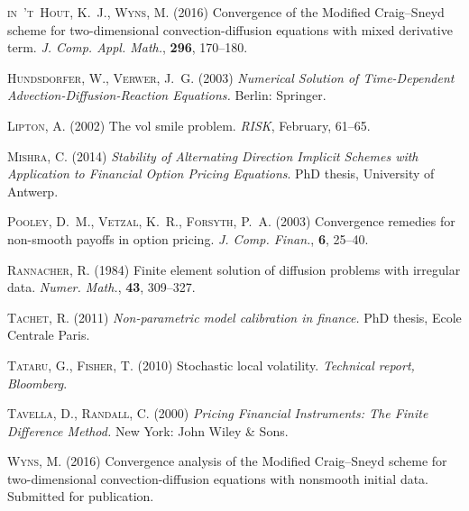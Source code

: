 \documentclass[10pt]{article}
\begin{document}
\begin{thebibliography}{99}
 \textsc{in~'t~Hout, K.~J., Wyns, M.} (2016)
Convergence of the Modified Craig--Sneyd scheme for two-dimensional convection-diffusion equations with mixed derivative term.
\textit{J. Comp. Appl. Math.}, \textbf{296}, 170--180.

 \textsc{Hundsdorfer, W., Verwer, J.~G.} (2003)
\textit{Numerical Solution of Time-Dependent Advection-Diffusion-Reaction Equations.}
Berlin: Springer.

 \textsc{Lipton, A.} (2002)
The vol smile problem.
\textit{RISK}, February, 61--65.

 \textsc{Mishra, C.} (2014)
\textit{Stability of Alternating Direction Implicit Schemes with Application to Financial
Option Pricing Equations}.
PhD thesis, University of Antwerp.

 \textsc{Pooley, D.~M., Vetzal, K.~R., Forsyth, P.~A.} (2003)
Convergence remedies for non-smooth payoffs in option pricing.
\textit{J. Comp. Finan.}, \textbf{6}, 25--40.

 \textsc{Rannacher, R.} (1984)
Finite element solution of diffusion problems with irregular data.
\textit{Numer. Math.}, \textbf{43}, 309--327.

 \textsc{Tachet, R.} (2011)
\textit{Non-parametric model calibration in finance.}
PhD thesis, Ecole Centrale Paris.

 \textsc{Tataru, G., Fisher, T.} (2010)
Stochastic local volatility.
\textit{Technical report, Bloomberg}.

 \textsc{Tavella, D., Randall, C.} (2000)
\textit{Pricing Financial Instruments: The Finite Difference Method.}
New York: John Wiley \& Sons.

 \textsc{Wyns, M.} (2016)
Convergence analysis of the Modified Craig--Sneyd scheme for two-dimensional 
convection-diffusion equations with nonsmooth initial data.
Submitted for publication.

\end{thebibliography}
\end{document}
